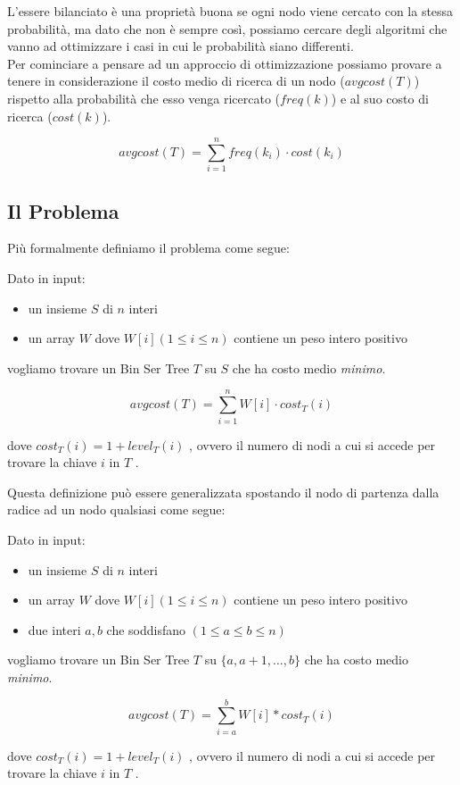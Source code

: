 L'essere bilanciato è una proprietà buona se ogni nodo viene cercato con la
stessa probabilità, ma dato che non è sempre così, possiamo cercare degli
algoritmi che vanno ad ottimizzare i casi in cui le probabilità siano
differenti.\\

Per cominciare a pensare ad un approccio di ottimizzazione possiamo provare a
tenere in considerazione il costo medio di ricerca di un nodo ($avgcost(T)$)
rispetto alla probabilità che esso venga ricercato ($freq(k)$) e al suo costo
di ricerca ($cost(k)$).

\[
    avgcost(T) = \sum_{i=1}^{n} freq(k_i) \cdot cost(k_i)
\]

\subsection{Il Problema}

Più formalmente definiamo il problema come segue:

\begin{boxed}
    Dato in input:
    \begin{itemize}
        \item un insieme $S$ di $n$ interi
        \item un array $W$ dove $W[i] (1 \leq i \leq n)$ contiene un peso intero positivo
    \end{itemize}

    vogliamo trovare un Bin Ser Tree $T$ su $S$ che ha costo medio \textit{minimo}.

    \[
        avgcost(T) = \sum_{i=1}^{n} W[i] \cdot cost_T(i)
    \]

    dove $cost_T(i) = 1 + level_T(i)$ , ovvero il numero di nodi a cui si accede per trovare
    la chiave $i$ in $T$ .
\end{boxed}

Questa definizione può essere generalizzata spostando il nodo di partenza dalla
radice ad un nodo qualsiasi come segue:

\begin{boxed}
    Dato in input:
    \begin{itemize}[itemsep=0.5pt]
        \item un insieme $S$ di $n$ interi
        \item un array $W$ dove $W[i] (1 \leq i \leq n)$ contiene un peso intero
              positivo
        \item due interi $a, b$ che soddisfano $(1 \leq a \leq b \leq n)$
    \end{itemize}

    vogliamo trovare un Bin Ser Tree $T$ su $\{a, a+1, \ldots, b\}$ che ha costo
    medio \textit{minimo}.

    $$avgcost(T) = \sum_{i=a}^{b} W[i] * cost_T(i)$$

    dove $cost_T(i) = 1 + level_T(i)$ , ovvero il numero di nodi a cui si accede
    per trovare la chiave $i$ in $T$ .
\end{boxed}

